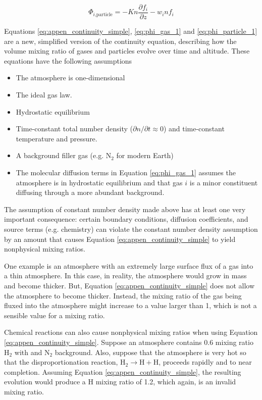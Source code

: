 \begin{equation} \label{eq:phi_particle_1}
  \Phi_{i\text{,particle}} = - Kn\frac{\partial f_{i}}{\partial z} - w_i n f_{i}
\end{equation}

Equations \eqref{eq:appen_continuity_simple}, \eqref{eq:phi_gas_1} and \eqref{eq:phi_particle_1} are a new, simplified version of the continuity equation, describing how the volume mixing ratio of gases and particles evolve over time and altitude. These equations have the following assumptions
\begin{itemize}
  \item The atmosphere is one-dimensional
  \item The ideal gas law.
  \item Hydrostatic equilibrium
  \item Time-constant total number density ($\partial n / \partial t \approx 0$) and time-constant temperature and pressure.
  \item A background filler gas (e.g. N$_2$ for modern Earth)
  \item The molecular diffusion terms in Equation \eqref{eq:phi_gas_1} assumes the atmosphere is in hydrostatic equilibrium and that gas $i$ is a minor constituent diffusing through a more abundant background.
\end{itemize}

The assumption of constant number density made above has at least one very important consequence: certain boundary conditions, diffusion coefficients, and source terms (e.g. chemistry) can violate the constant number density assumption by an amount that causes Equation \eqref{eq:appen_continuity_simple} to yield nonphysical mixing ratios.

One example is an atmosphere with an extremely large surface flux of a gas into a thin atmosphere. In this case, in reality, the atmosphere would grow in mass and become thicker. But, Equation \eqref{eq:appen_continuity_simple} does not allow the atmosphere to become thicker. Instead, the mixing ratio of the gas being fluxed into the atmosphere might increase to a value larger than 1, which is not a sensible value for a mixing ratio.

Chemical reactions can also cause nonphysical mixing ratios when using Equation \eqref{eq:appen_continuity_simple}. Suppose an atmosphere contains 0.6 mixing ratio H$_2$ with and N$_2$ background. Also, suppose that the atmosphere is very hot so that the disproportionation reaction, $\mathrm{H_2} \rightarrow \mathrm{H} + \mathrm{H}$, proceeds rapidly and to near completion. Assuming Equation \eqref{eq:appen_continuity_simple}, the resulting evolution would produce a H mixing ratio of 1.2, which again, is an invalid mixing ratio.


